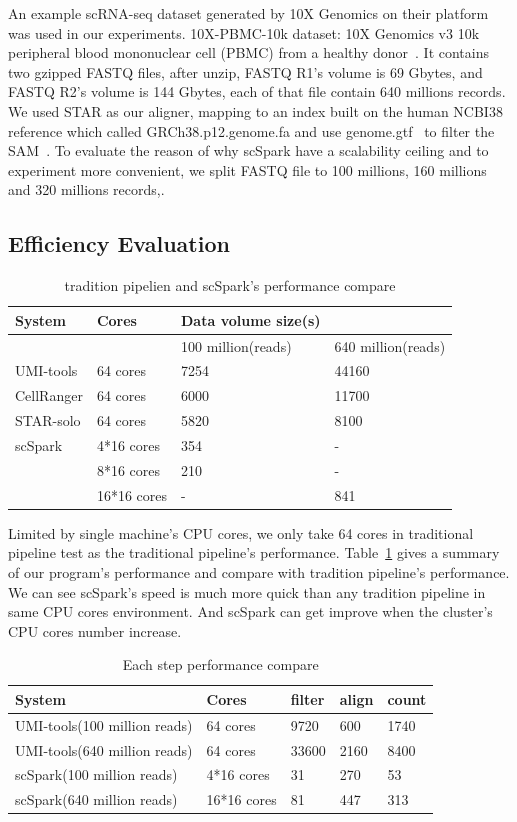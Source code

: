 \documentclass[runningheads]{llncs}
\begin{document}
An example scRNA-seq dataset generated by 10X Genomics on their platform was used in our experiments.
10X-PBMC-10k dataset: 10X Genomics v3 10k peripheral blood mononuclear cell (PBMC) from a healthy donor~\cite{ref_url4}. 
It contains two gzipped FASTQ files, after unzip, FASTQ R1's volume is 69 Gbytes, and FASTQ R2's volume is 144 Gbytes, each of that file contain 640 millions records.
We used STAR as our aligner, mapping to an index built on the human NCBI38 reference which called GRCh38.p12.genome.fa and use genome.gtf~\cite{ref_url5} to filter the SAM~\cite{ref_url5}.
To evaluate the reason of why scSpark have a scalability ceiling and to experiment more convenient, we split FASTQ file to 100 millions, 160 millions and 320 millions records,.
\subsection{Efficiency Evaluation}
\begin{table}
  \centering
  \caption{tradition pipelien and scSpark's performance compare}\label{tab1}
  \begin{tabular}{l | l | l  l}
  \hline
  System &  Cores & Data volume size(s) \\
  \hline
   &  & 100 million(reads) & 640 million(reads) \\
  \hline
  UMI-tools & 64 cores & 7254 & 44160 \\
  \hline
  CellRanger & 64 cores & 6000 & 11700 \\
  \hline
  STAR-solo & 64 cores &  5820 & 8100 \\
  \hline
  scSpark & 4*16 cores & 354 & - \\
   & 8*16 cores & 210 & - \\
   & 16*16 cores & - & 841 \\
  \hline
  \end{tabular}
\end{table}
Limited by single machine's CPU cores, we only take 64 cores in traditional pipeline test as the traditional pipeline's performance.
Table~\ref{tab1} gives a summary of our program's performance and compare with tradition pipeline's performance.
We can see scSpark's speed is much more quick than any tradition pipeline in same CPU cores environment.
And scSpark can get improve when the cluster's CPU cores number increase.
\begin{table}
  \centering
  \caption{Each step performance compare}\label{tab2}
  \begin{tabular}{l | l | l | l | l}
  \hline
  System & Cores & filter & align & count \\
  \hline
  UMI-tools(100 million reads) & 64 cores & 9720 & 600 & 1740 \\
  \hline
  UMI-tools(640 million reads) & 64 cores & 33600 & 2160 & 8400 \\
  \hline
  scSpark(100 million reads) & 4*16 cores & 31 & 270 & 53 \\
  \hline
  scSpark(640 million reads) & 16*16 cores & 81 & 447 & 313 \\
  \hline
  \end{tabular}
\end{table}
\end{document}
